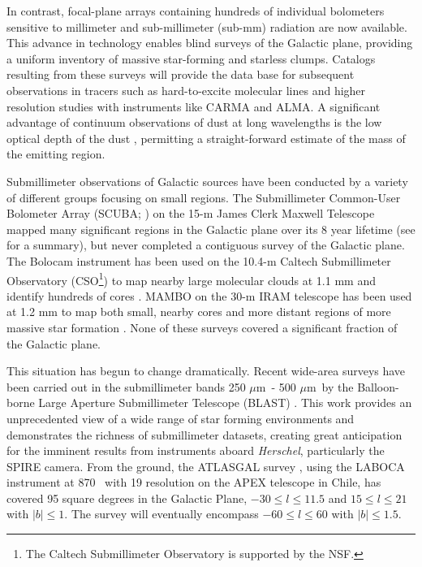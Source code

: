 \documentclass[12pt,preprint]{aastex}
\newcommand{\mum}{\ensuremath{\mu \mathrm{m}}}
\begin{document}
In contrast, focal-plane arrays containing hundreds of individual
bolometers sensitive to millimeter and sub-millimeter (sub-mm)
radiation are now available. This advance in technology enables blind
surveys of the Galactic plane, providing a uniform inventory of
massive star-forming and starless clumps.  Catalogs resulting from
these surveys will provide the data base for subsequent observations
in tracers such as hard-to-excite molecular lines and higher
resolution studies with instruments like CARMA and ALMA.  A
significant advantage of continuum observations of dust at long
wavelengths is the low optical depth of the dust \citep{johnstone06},
permitting a straight-forward estimate of the mass of the emitting
region.

Submillimeter observations of Galactic sources have been conducted by
a variety of different groups focusing on small regions.  The
Submillimeter Common-User Bolometer Array (SCUBA; \citet{holland99})
on the 15-m James Clerk Maxwell Telescope mapped many significant
regions in the Galactic plane over its 8 year lifetime (see
\citet{difrancesco08} for a summary), but never completed a contiguous
survey of the Galactic plane.  The Bolocam instrument has been used on
the 10.4-m Caltech Submillimeter Observatory (CSO\footnote{The Caltech
Submillimeter Observatory is supported by the NSF.}) to map nearby
large molecular clouds at 1.1 mm and identify hundreds of cores
\citep{enoch07}.  MAMBO on the 30-m IRAM telescope has been used at
1.2 mm to map both small, nearby cores \citep{kauffmann08} and more
distant regions of more massive star formation
\citep{rathborne06,motte07}.  None of these surveys covered a
significant fraction of the Galactic plane.

This situation has begun to change dramatically.  Recent wide-area
surveys have been carried out in the submillimeter bands 250 \mum\ -
500 \mum\ by the Balloon-borne Large Aperture Submillimeter Telescope
(BLAST) \citep{olmi09,roy10,netterfield09,chapin08}.  This work
provides an unprecedented view of a wide range of star forming
environments and demonstrates the richness of submillimeter datasets,
creating great anticipation for the imminent results from instruments
aboard {\em Herschel}, particularly the SPIRE camera.  From the
ground, the ATLASGAL survey \citep{schuller09}, using the LABOCA
instrument at 870 \micron\ with 19 resolution on the APEX
telescope in Chile, has covered 95 square degrees in the Galactic
Plane, $-30 \le l \le 11.5$ and $15 \le l \le 21$ with $|b| \le 1$.
The survey will eventually encompass $-60 \le l \le 60$ with $|b| \le
1.5$.
\end{document}
